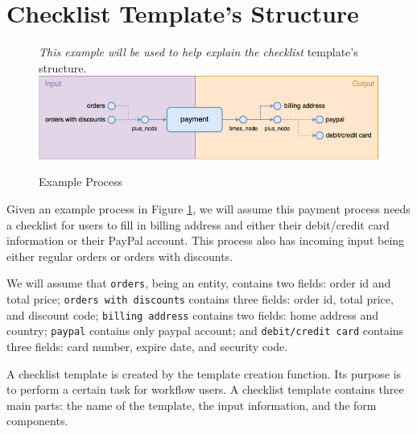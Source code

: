 
\section{Checklist Template's Structure}
\label{checklist_strcuture}


\begin{figure}[ht!]
    \centering
    \textit{This example will be used to help explain the checklist} template's structure.
    \includegraphics[width=\textwidth]{overleaf/images/template_example.png}
    \caption{Example Process}
    \label{fig:template_example}
\end{figure}

Given an example process in Figure \ref{fig:template_example}, we will assume this payment process needs a checklist for users to fill in billing address and either their debit/credit card information or their PayPal account. This process also has incoming input being either regular orders or orders with discounts.

We will assume that \verb!orders!, being an entity, contains two fields: order id and total price; \verb!orders with discounts! contains three fields: order id, total price, and discount code; \verb!billing address! contains two fields: home address and country; \verb!paypal! contains only paypal account; and \verb!debit/credit card! contains three fields: card number, expire date, and security code.




A checklist template is created by the template creation function. Its purpose is to perform a certain task for workflow users.
A checklist template contains three main parts: the name of the template, the input information, and the form components.

